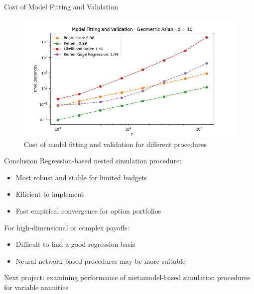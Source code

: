 \documentclass[9pt,handout]{beamer}
\begin{document}
\begin{frame}{Cost of Model Fitting and Validation}

    \begin{figure}
        \includegraphics[width=\textwidth]{../project1/figures/figure12b.png}
        \caption{Cost of model fitting and validation for different procedures}
    \end{figure}

\end{frame}

\begin{frame}{Conclusion}
    Regression-based nested simulation procedure:
    \begin{itemize}
        \item Most robust and stable for limited budgets
        \item Efficient to implement
        \item Fast empirical convergence for option portfolios
    \end{itemize}

    \vspace{10pt}

    For high-dimensional or complex payoffs:
    \begin{itemize}
        \item Difficult to find a good regression basis
        \item Neural network-based procedures may be more suitable
    \end{itemize}

    \vspace{10pt}

    Next project: examining performance of metamodel-based simulation procedures for variable annuities


\end{frame}
\end{document}
